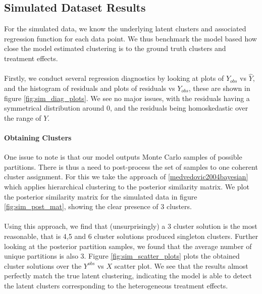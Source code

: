 \documentclass{article}
\begin{document}
\subsection{Simulated Dataset Results} 
For the simulated data, we know the underlying latent clusters and associated regression function for each data point. We thus benchmark the model based how close the model estimated clustering is to the ground truth clusters and treatment effects.
\\ \\
Firstly, we conduct several regression diagnostics by looking at plots of $Y_{obs}$ vs $\hat{Y}$, and the histogram of residuals and plots of residuals vs $Y_{obs}$, these are shown in figure \ref{fig:sim_diag_plots}. We see no major issues, with the residuals having a symmetrical distribution around 0, and the residuals being homoskedastic over the range of $Y$.
\paragraph{Obtaining Clusters} One issue to note is that our model outputs Monte Carlo samples of possible partitions. There is thus a need to post-process the set of samples to one coherent cluster assignment. For this we take the approach of \ref{medvedovic2004bayesian} which applies hierarchical clustering to the posterior similarity matrix. We plot the posterior similarity matrix for the simulated data in figure \ref{fig:sim_post_mat}, showing the clear presence of 3 clusters. 
\\ \\
Using this approach, we find that (unsurprisingly) a 3 cluster solution is the most reasonable, that is 4,5 and 6 cluster solutions produced singleton clusters. Further looking at the posterior partition samples, we found that the average number of unique partitions is also 3. Figure \ref{fig:sim_scatter_plots} plots the obtained cluster solutions over the $Y^{obs}$ vs $X$ scatter plot. We see that the results almost perfectly match the true latent clustering, indicating the model is able to detect the latent clusters corresponding to the heterogeneous treatment effects. 
\end{document}
